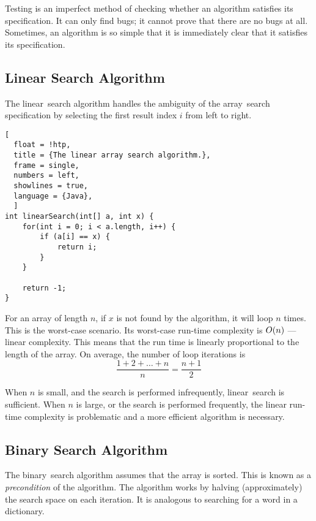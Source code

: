 Testing is an imperfect method of checking whether an algorithm satisfies its specification.
It can only find bugs; it cannot prove that there are no bugs at all.
Sometimes, an algorithm is so simple that it is immediately clear that it satisfies its specification.

\subsection{Linear Search Algorithm}

The linear~search algorithm handles the ambiguity of the array~search specification by selecting the first result index \( i \) from left to right.

\begin{lstlisting}[
  float = !htp,
  title = {The linear array search algorithm.},
  frame = single,
  numbers = left,
  showlines = true,
  language = {Java},
  ]
int linearSearch(int[] a, int x) {
    for(int i = 0; i < a.length, i++) {
        if (a[i] == x) {
            return i;
        }
    }

    return -1;
}
\end{lstlisting}

For an array of length \( n \), if \( x \) is not found by the algorithm, it will loop \( n \) times.
This is the worst-case scenario.
Its worst-case run-time complexity is \( O\!\left(n\right) \) --- linear complexity.
This means that the run time is linearly proportional to the length of the array.
On average, the number of loop iterations is
\begin{equation*}
  \frac{1 + 2 + \ldots + n}{n} = \frac{n + 1}{2}
\end{equation*}

When \( n \) is small, and the search is performed infrequently, linear~search is sufficient.
When \( n \) is large, or the search is performed frequently, the linear run-time complexity is problematic and a more efficient algorithm is necessary.

\subsection{Binary Search Algorithm}

The binary~search algorithm assumes that the array is sorted.
This is known as a \emph{precondition} of the algorithm.
The algorithm works by halving (approximately) the search space on each iteration.
It is analogous to searching for a word in a dictionary.

